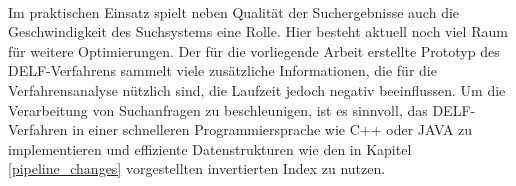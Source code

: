\\
Im praktischen Einsatz spielt neben Qualität der Suchergebnisse auch die Geschwindigkeit des Suchsystems eine Rolle. Hier besteht aktuell noch viel Raum für weitere Optimierungen. Der für die vorliegende Arbeit erstellte Prototyp des DELF-Verfahrens sammelt viele zusätzliche Informationen, die für die Verfahrensanalyse nützlich sind, die Laufzeit jedoch negativ beeinflussen. Um die Verarbeitung von Suchanfragen zu beschleunigen, ist es sinnvoll, das DELF-Verfahren in einer schnelleren Programmiersprache wie C++ oder JAVA zu implementieren und effiziente Datenstrukturen wie den in Kapitel \ref{pipeline_changes} vorgestellten invertierten Index zu nutzen.
